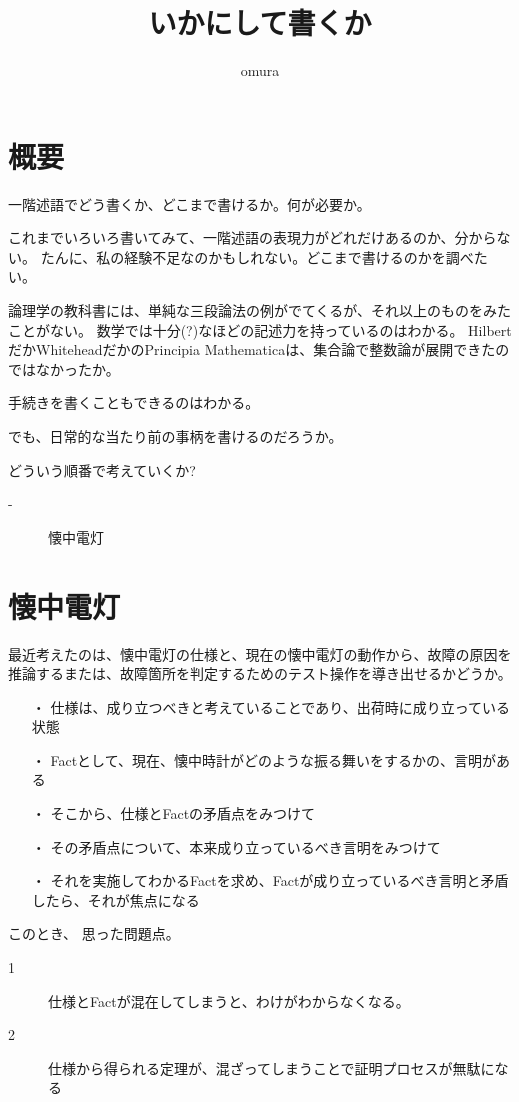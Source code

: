 \documentclass[10pt, oneside]{jarticle}   	%
\title{いかにして書くか}
\author{omura}
\theoremstyle{definition}
\begin{document}
\maketitle

\section{概要}
一階述語でどう書くか、どこまで書けるか。何が必要か。

これまでいろいろ書いてみて、一階述語の表現力がどれだけあるのか、分からない。
たんに、私の経験不足なのかもしれない。どこまで書けるのかを調べたい。

論理学の教科書には、単純な三段論法の例がでてくるが、それ以上のものをみたことがない。
数学では十分(?)なほどの記述力を持っているのはわかる。
HilbertだかWhiteheadだかのPrincipia Mathematicaは、集合論で整数論が展開できたのではなかったか。

手続きを書くこともできるのはわかる。

でも、日常的な当たり前の事柄を書けるのだろうか。

どういう順番で考えていくか?
\begin{description}
\item[ - ] 懐中電灯 
\end{description}


\section{懐中電灯}
最近考えたのは、懐中電灯の仕様と、現在の懐中電灯の動作から、故障の原因を推論するまたは、故障箇所を判定するためのテスト操作を導き出せるかどうか。

\begin{enumerate}
\item[・]仕様は、成り立つべきと考えていることであり、出荷時に成り立っている状態
\item[・]Factとして、現在、懐中時計がどのような振る舞いをするかの、言明がある
\item[・]そこから、仕様とFactの矛盾点をみつけて
\item[・]その矛盾点について、本来成り立っているべき言明をみつけて
\item[・]それを実施してわかるFactを求め、Factが成り立っているべき言明と矛盾したら、それが焦点になる
\end{enumerate}

このとき、 思った問題点。
\begin{description}
\item[1] 仕様とFactが混在してしまうと、わけがわからなくなる。
\item[2] 仕様から得られる定理が、混ざってしまうことで証明プロセスが無駄になる
\end{description}
\end{document}
